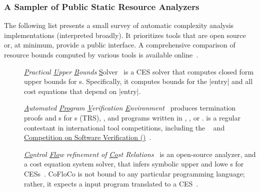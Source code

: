 \subsubsection{A Sampler of Public Static Resource Analyzers}
\label{resource-analysis-tools}

The following list presents a small survey of automatic complexity analysis
implementations (interpreted broadly). It prioritizes tools that are open source
or, at minimum, provide a public interface. A comprehensive comparison of
resource bounds computed by various tools is available
online~\cite{flores_experiments}.

\begin{description}

\item[\href{https://costa.fdi.ucm.es/~costa/pubs/pubs.php}{}]
      \emph{\underline{P}ractical \underline{U}pper \underline{B}ounds}
      \underline{S}olver~\cite{albert2010}
      is a CES solver that computes closed form upper bounds for s. Specifically, it computes bounds for the \pr|entry| and
      all cost equations that depend on \pr|entry|.

\item[\href{https://aprove.informatik.rwth-aachen.de}{}]
      \emph{\underline{A}utomated \underline{Pro}gram \underline{V}erification
      \underline{E}nvironment}~\cite{giesl2016} produces termination proofs and
      s for s (TRS), , and programs written in , ,
      or .
       is a regular contestant in international tool competitions,
      including the
      \href{https://termination-portal.org/wiki/Termination_Competition}%
      {}~\cite{giesl2019}
      and \href{https://sv-comp.sosy-lab.org}%
      {Competition on Software Verification ()}~\cite{beyer2022}.

\item[\href{https://github.com/aeflores/CoFloCo}{}]
    \emph{\underline{Co}ntrol \underline{Flo}w refinement of \underline{Co}st
    Relations}~\cite{floresmontoya2014} is an open-source analyzer, and a cost
    equation system solver, that infers symbolic upper and
    lowe s for
    CESs~\cite{flores-montoya2016}. CoFloCo is not bound to any particular
    programming language; rather, it expects a input program translated to a
    CES~\cite{flores2016}.


\end{description}
